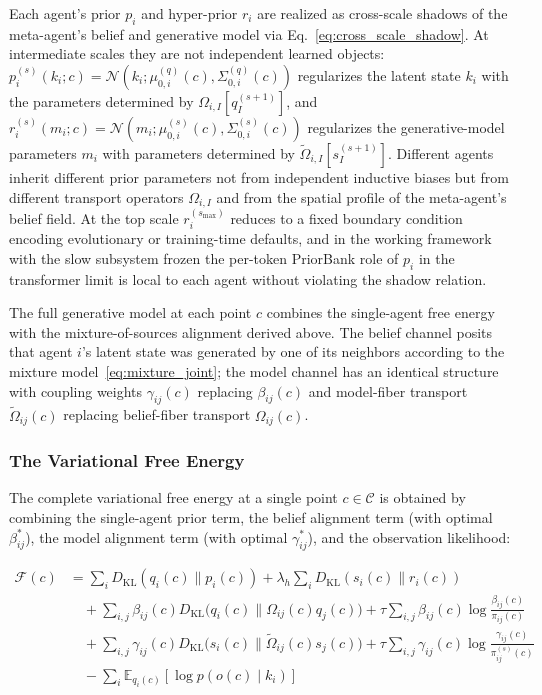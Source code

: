 \documentclass[11pt]{article}
\begin{document}
Each agent's prior $p_i$ and hyper-prior $r_i$ are realized as cross-scale shadows of the meta-agent's belief and generative model via Eq.~\eqref{eq:cross_scale_shadow}. At intermediate scales they are not independent learned objects: $p_i^{(s)}(k_i; c) = \mathcal{N}(k_i; \mu_{0,i}^{(q)}(c), \Sigma_{0,i}^{(q)}(c))$ regularizes the latent state $k_i$ with the parameters determined by $\Omega_{i,I}[q_I^{(s+1)}]$, and $r_i^{(s)}(m_i; c) = \mathcal{N}(m_i; \mu_{0,i}^{(s)}(c), \Sigma_{0,i}^{(s)}(c))$ regularizes the generative-model parameters $m_i$ with parameters determined by $\tilde\Omega_{i,I}[s_I^{(s+1)}]$. Different agents inherit different prior parameters not from independent inductive biases but from different transport operators $\Omega_{i,I}$ and from the spatial profile of the meta-agent's belief field. At the top scale $r_i^{(s_{\max})}$ reduces to a fixed boundary condition encoding evolutionary or training-time defaults, and in the working framework with the slow subsystem frozen the per-token PriorBank role of $p_i$ in the transformer limit is local to each agent without violating the shadow relation.

The full generative model at each point $c$ combines the single-agent free energy~\cite{Friston2010, parr2022active} with the mixture-of-sources alignment derived above. The belief channel posits that agent $i$'s latent state was generated by one of its neighbors according to the mixture model~\eqref{eq:mixture_joint}; the model channel has an identical structure with coupling weights $\gamma_{ij}(c)$ replacing $\beta_{ij}(c)$ and model-fiber transport $\tilde{\Omega}_{ij}(c)$ replacing belief-fiber transport $\Omega_{ij}(c)$.

\subsubsection{The Variational Free Energy}

The complete variational free energy at a single point $c \in \mathcal{C}$ is obtained by combining the single-agent prior term, the belief alignment term (with optimal $\beta^*_{ij}$), the model alignment term (with optimal $\gamma^*_{ij}$), and the observation likelihood:

\begin{equation}
\begin{aligned}
\mathcal{F}(c) &= \sum_i D_{\mathrm{KL}}(q_i(c) \| p_i(c)) + \lambda_h \sum_i D_{\mathrm{KL}}(s_i(c) \| r_i(c)) \\
&\quad + \sum_{i,j} \beta_{ij}(c)  D_{\mathrm{KL}}\big(q_i(c) \big\| \Omega_{ij}(c)q_j(c)\big) + \tau \sum_{i,j} \beta_{ij}(c) \log\frac{\beta_{ij}(c)}{\pi_{ij}(c)} \\
&\quad + \sum_{i,j} \gamma_{ij}(c)  D_{\mathrm{KL}}\big(s_i(c) \big\| \tilde{\Omega}_{ij}(c)s_j(c)\big) + \tau \sum_{i,j} \gamma_{ij}(c) \log\frac{\gamma_{ij}(c)}{\pi^{(s)}_{ij}(c)} \\
&\quad - \sum_i \mathbb{E}_{q_i(c)}[\log p(o(c) \mid k_i)]
\end{aligned}
\label{eq:pointwise_free_energy}
\end{equation}
\end{document}
